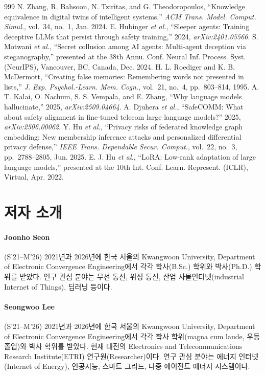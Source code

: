 \begin{thebibliography}{999}
 N. Zhang, R. Bahsoon, N. Tziritas, and G. Theodoropoulos, ``Knowledge equivalence in digital twins of intelligent systems,'' \emph{ACM Trans. Model. Comput. Simul.}, vol.~34, no.~1, Jan. 2024.
 E. Hubinger \emph{et al.}, ``Sleeper agents: Training deceptive LLMs that persist through safety training,'' 2024, \emph{arXiv:2401.05566}.
 S. Motwani \emph{et al.}, ``Secret collusion among AI agents: Multi-agent deception via steganography,'' presented at the 38th Annu. Conf. Neural Inf. Process. Syst. (NeurIPS), Vancouver, BC, Canada, Dec. 2024.
 H. L. Roediger and K. B. McDermott, ``Creating false memories: Remembering words not presented in lists,'' \emph{J. Exp. Psychol.-Learn. Mem. Cogn.}, vol.~21, no.~4, pp.~803--814, 1995.
 A. T. Kalai, O. Nachum, S. S. Vempala, and E. Zhang, ``Why language models hallucinate,'' 2025, \emph{arXiv:2509.04664}.
 A. Djuhera \emph{et al.}, ``SafeCOMM: What about safety alignment in fine-tuned telecom large language models?'' 2025, \emph{arXiv:2506.00062}.
 Y. Hu \emph{et al.}, ``Privacy risks of federated knowledge graph embedding: New membership inference attacks and personalized differential privacy defense,'' \emph{IEEE Trans. Dependable Secur. Comput.}, vol.~22, no.~3, pp.~2788--2805, Jun. 2025.
 E. J. Hu \emph{et al.}, ``LoRA: Low-rank adaptation of large language models,'' presented at the 10th Int. Conf. Learn. Represent. (ICLR), Virtual, Apr. 2022.

\end{thebibliography}

\section*{저자 소개}
\sloppy

\paragraph{Joonho Seon} (S'21--M'26)
2021년과 2026년에 한국 서울의 Kwangwoon University, Department of Electronic Convergence Engineering에서 각각 학사(B.Sc.) 학위와 박사(Ph.D.) 학위를 받았다.
연구 관심 분야는 무선 통신, 위성 통신, 산업 사물인터넷(industrial Internet of Things), 딥러닝 등이다.

\paragraph{Seongwoo Lee} (S'21--M'26)
2021년과 2026년에 한국 서울의 Kwangwoon University, Department of Electronic Convergence Engineering에서 각각 학사 학위(magna cum laude, 우등 졸업)와 박사 학위를 받았다.
현재 대전의 Electronics and Telecommunications Research Institute(ETRI) 연구원(Researcher)이다.
연구 관심 분야는 에너지 인터넷(Internet of Energy), 인공지능, 스마트 그리드, 다중 에이전트 에너지 시스템이다.

